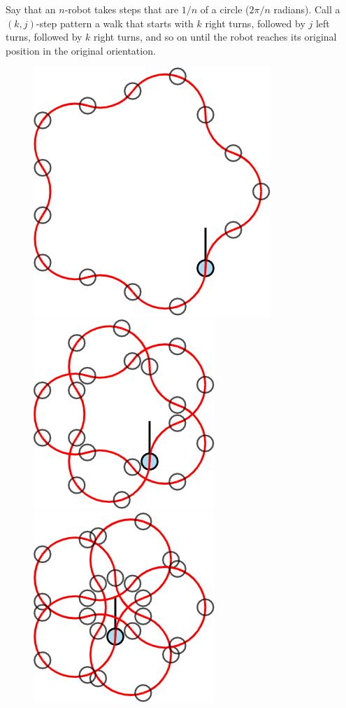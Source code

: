 \documentclass{article}
\begin{document}
Say that an $n$-robot takes steps that are $1/n$ of a circle ($2\pi/n$ radians).
Call a $(k, j)$-step pattern a walk that starts with $k$ right turns, followed
by $j$ left turns, followed by $k$ right turns, and so on until the robot
reaches its original position in the original orientation.
\begin{figure}[ht!]
  \centering
  \includegraphics[scale=0.18]{assets/robot_walks/079_problem_5-robot_1_2.png}
  \includegraphics[scale=0.18]{assets/robot_walks/079_problem_5-robot_1_3.png}
  \includegraphics[scale=0.18]{assets/robot_walks/079_problem_5-robot_1_4.png}

\end{figure}
\end{document}
